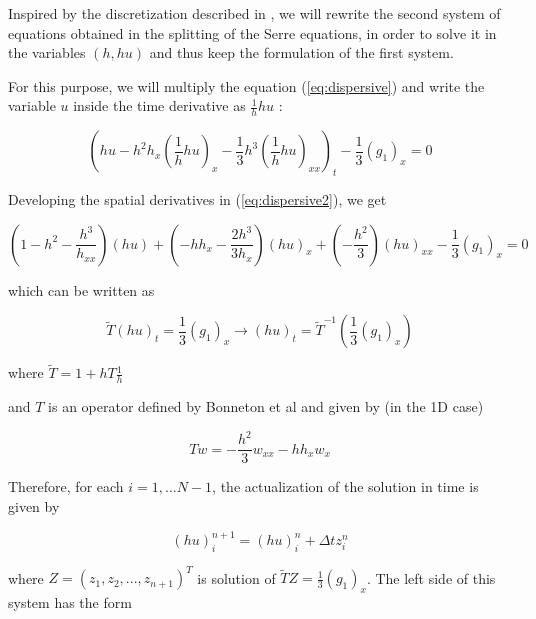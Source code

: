 \indent Inspired by the discretization described in \cite{Bonneton2011}, we will rewrite the second system of equations obtained in the splitting of the Serre equations, in order to solve it in the variables $(h,hu)$ and thus keep the formulation of the first system.
 
\indent For this purpose, we will multiply the equation (\ref{eq:dispersive}) and write the variable $u$ inside the time derivative as $\frac{1}{h} hu$ :
 
 \begin{equation}
\label{eq:dispersive2}
\left( hu - h^2h_x \left( \frac{1}{h} hu \right)_x - \frac{1}{3}h^3\left( \frac{1}{h} hu \right)_{xx} \right)_t  - \frac{1}{3}\left(g_1 \right)_x = 0
\end{equation}

\indent Developing the spatial derivatives in (\ref{eq:dispersive2}), we get

\begin{equation}
\label{eq:dispersive3}
       \left( 1-h^2 - \frac{h^3}{h_{xx}} \right)(hu) + \left( -hh_x - \frac{2h^3}{3h_{x}} \right)(hu)_x + \left( - \frac{h^2}{3} \right)(hu)_{xx} - \frac{1}{3}\left(g_1 \right)_x = 0
\end{equation}

\noindent which can be written as

\begin{equation}
    \tilde{T} (hu)_t = \frac{1}{3}\left(g_1 \right)_x \rightarrow (hu)_t = \tilde{T}^{-1}\left(\frac{1}{3}\left(g_1 \right)_x\right)
\end{equation}

\noindent where $\tilde{T} = 1 + hT\frac{1}{h} $

\noindent and $T$ is an operator defined by Bonneton et al and given by (in the 1D case)

\begin{equation}
   Tw = -\frac{h^2}{3}w_{xx} - hh_xw_x
\end{equation}

\indent Therefore, for each $i=1,...N-1$, the actualization of the solution in time is given by

\begin{equation}
(hu)_i^{n+1} = (hu)_i^n + \Delta t z_i^n
\end{equation}

\noindent where $Z = (z_1,z_2,...,z_{n+1})^T$ is solution of $\tilde{T}Z = \frac{1}{3}\left(g_1 \right)_x$. The left side of this system has the form

